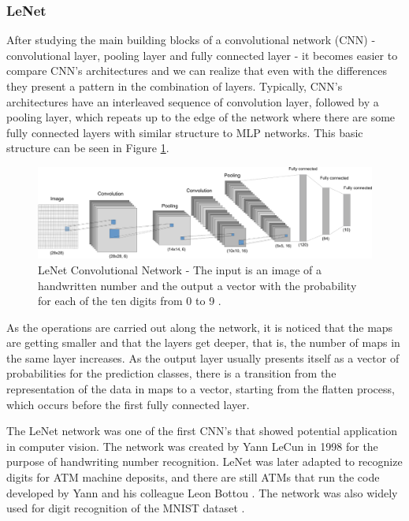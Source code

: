 \subsubsection{LeNet} \label{lenet}

After studying the main building blocks of a convolutional network (CNN) - convolutional layer, pooling layer and fully connected layer - it becomes easier to compare CNN's architectures and we can realize that even with the differences they present a pattern in the combination of layers. Typically, CNN's architectures have an interleaved sequence of convolution layer, followed by a pooling layer, which repeats up to the edge of the network where there are some fully connected layers with similar structure to MLP networks. This basic structure can be seen in Figure \ref{fig:lenet}.

\begin{figure}
    \centering
    \includegraphics[scale=0.4]{"Part 3 - Learning Systems/Supervised Learning/Deep Learning/images/figure125.png"}
    \caption{ LeNet Convolutional Network - The input is an image of a handwritten number and the output a vector with the probability for each of the ten digits from 0 to 9 \cite{zhang2020dive}.}
    \label{fig:lenet}
\end{figure}

As the operations are carried out along the network, it is noticed that the maps are getting smaller and that the layers get deeper, that is, the number of maps in the same layer increases. As the output layer usually presents itself as a vector of probabilities for the prediction classes, there is a transition from the representation of the data in maps to a vector, starting from the flatten process, which occurs before the first fully connected layer.

The LeNet network was one of the first CNN's that showed potential application in computer vision. The network was created by Yann LeCun in 1998 for the purpose of handwriting number recognition. LeNet was later adapted to recognize digits for ATM machine deposits, and there are still ATMs that run the code developed by Yann and his colleague Leon Bottou \cite{zhang2020dive}. The network was also widely used for digit recognition of the MNIST dataset \cite{geron2019}. %

